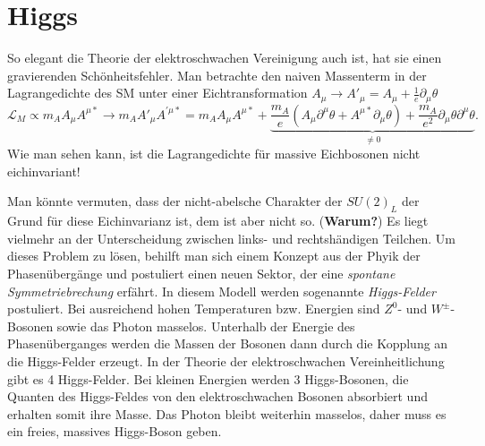 \chapter{Higgs}
So elegant die Theorie der elektroschwachen Vereinigung auch ist, hat sie einen gravierenden Schönheitsfehler.
Man betrachte den naiven Massenterm in der Lagrangedichte des SM unter einer Eichtransformation $A_\mu \rightarrow A'_\mu = A_\mu + \frac{1}{e}\partial_\mu\theta$
\begin{equation*}
	\mathcal{L}_M \propto m_A A_\mu A^{\mu*}\longrightarrow m_A A'_\mu A^{'\mu*} = m_A A_\mu A^{\mu*} + \underbrace{\frac{m_A}{e}(A_\mu\partial^\mu\theta + A^{\mu*}\partial_\mu\theta) + \frac{m_A}{e^2}\partial_\mu\theta\partial^\mu\theta}_{\neq 0}.
\end{equation*}
Wie man sehen kann, ist die Lagrangedichte für massive Eichbosonen nicht eichinvariant!

Man könnte vermuten, dass der nicht-abelsche Charakter der $SU(2)_L$ der Grund für diese Eichinvarianz ist, dem ist aber nicht so. (\textbf{Warum?}) %
Es liegt vielmehr an der Unterscheidung zwischen links- und rechtshändigen Teilchen.
Um dieses Problem zu lösen, behilft man sich einem Konzept aus der Phyik der Phasenübergänge und postuliert einen neuen Sektor, der eine \textit{spontane Symmetriebrechung} erfährt.
In diesem Modell werden sogenannte \textit{Higgs-Felder} postuliert.
Bei ausreichend hohen Temperaturen bzw. Energien sind $Z^0$- und $W^\pm$-Bosonen sowie das Photon masselos.
Unterhalb der Energie des Phasenüberganges werden die Massen der Bosonen dann durch die Kopplung an die Higgs-Felder erzeugt.
In der Theorie der elektroschwachen Vereinheitlichung gibt es 4 Higgs-Felder.
Bei kleinen Energien werden 3 Higgs-Bosonen, die Quanten des Higgs-Feldes von den elektroschwachen Bosonen absorbiert und erhalten somit ihre Masse.
Das Photon bleibt weiterhin masselos, daher muss es ein freies, massives Higgs-Boson geben. 
